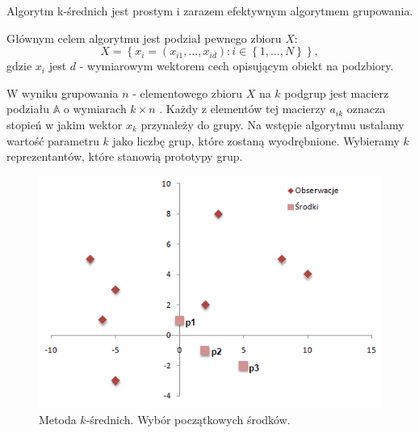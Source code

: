 \documentclass[12pt,a4paper]{report}
\newcommand{\set}[1]{\left\lbrace {#1} \right\rbrace}
\begin{document}
Algorytm k-średnich jest prostym i zarazem efektywnym algorytmem grupowania.

Głównym celem algorytmu jest podział pewnego zbioru $\mathit{X}$:
$$
\mathit{X} = \set{x_i = (x_{i1},\ldots,x_{id}) : i \in \set{1,\ldots,N}},
$$
gdzie $x_i$ jest $d$ - wymiarowym wektorem cech opisującym obiekt na podzbiory.

W wyniku grupowania $n$ - elementowego zbioru $\mathit{X}$ na $k$ podgrup jest macierz podziału $\mathbb{A}$ o wymiarach $k\times n$ . Każdy z elementów tej macierzy $a_{ik}$ oznacza stopień w jakim wektor $x_k$ przynależy do grupy. Na wstępie algorytmu ustalamy wartość parametru $k$ jako liczbę grup, które zostaną wyodrębnione. Wybieramy $k$ reprezentantów, które stanowią prototypy grup.
\begin{center}
\begin{figure}[H]
\centering
\includegraphics[scale=0.8]{ks_0.PNG} 
\caption{Metoda $k$-średnich. Wybór początkowych środków.}
\end{figure}
\end{center}
\end{document}
